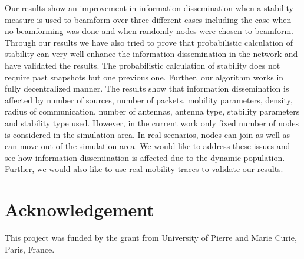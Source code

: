 \documentclass[preprint, twocolumn,5p]{elsarticle}
\begin{document}
Our results show an improvement in information dissemination when a stability measure is used to beamform over three different cases including the case when no beamforming was done and when randomly nodes were chosen to beamform. Through our results we have also tried to prove that probabilistic calculation of stability can very well enhance the information dissemination in the network and have validated the results. The probabilistic calculation of stability does not require past snapshots but one previous one. Further, our algorithm works in fully decentralized manner. The results show that information dissemination is affected by number of sources, number of packets, mobility parameters, density, radius of communication, number of antennas, antenna type, stability parameters and stability type used.
However, in the current work only fixed number of nodes is considered in the simulation area. In real scenarios, nodes can join as well as can move out of the simulation area. We would like to address these issues and see how information dissemination is affected due to the dynamic population. Further, we would also like to use real mobility traces to validate our results.

\section{Acknowledgement}\label{sec:acknowledgement}
This project was funded by the grant from University of Pierre and Marie Curie, Paris, France.



\end{document}
